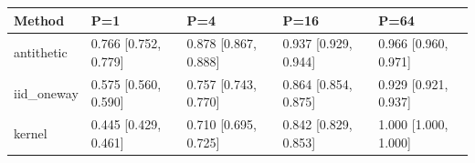 \begingroup\footnotesize\setlength{\tabcolsep}{3pt}
\begin{tabular}{lllll}
\toprule
Method & P=1 & P=4 & P=16 & P=64 \\
\midrule
antithetic & 0.766 [0.752, 0.779] & 0.878 [0.867, 0.888] & 0.937 [0.929, 0.944] & 0.966 [0.960, 0.971] \\
iid\_oneway & 0.575 [0.560, 0.590] & 0.757 [0.743, 0.770] & 0.864 [0.854, 0.875] & 0.929 [0.921, 0.937] \\
kernel & 0.445 [0.429, 0.461] & 0.710 [0.695, 0.725] & 0.842 [0.829, 0.853] & 1.000 [1.000, 1.000] \\
\bottomrule
\end{tabular}
\endgroup
